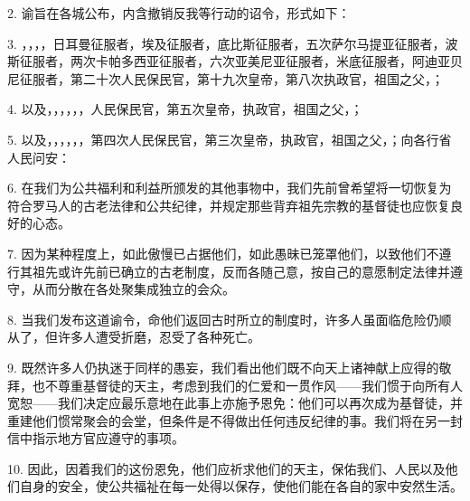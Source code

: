 2. 谕旨在各城公布，内含撤销反我等行动的诏令，形式如下：\par

3. ，，，，日耳曼征服者，埃及征服者，底比斯征服者，五次萨尔马提亚征服者，波斯征服者，两次卡帕多西亚征服者，六次亚美尼亚征服者，米底征服者，阿迪亚贝尼征服者，第二十次人民保民官，第十九次皇帝，第八次执政官，祖国之父，；\par

4. 以及，，，，，，人民保民官，第五次皇帝，执政官，祖国之父，；\par

5. 以及，，，，，，第四次人民保民官，第三次皇帝，执政官，祖国之父，；向各行省人民问安：\par

6. 在我们为公共福利和利益所颁发的其他事物中，我们先前曾希望将一切恢复为符合罗马人的古老法律和公共纪律，并规定那些背弃祖先宗教的基督徒也应恢复良好的心态。\par

7. 因为某种程度上，如此傲慢已占据他们，如此愚昧已笼罩他们，以致他们不遵行其祖先或许先前已确立的古老制度，反而各随己意，按自己的意愿制定法律并遵守，从而分散在各处聚集成独立的会众。\par

8. 当我们发布这道谕令，命他们返回古时所立的制度时，许多人虽面临危险仍顺从了，但许多人遭受折磨，忍受了各种死亡。\par

9. 既然许多人仍执迷于同样的愚妄，我们看出他们既不向天上诸神献上应得的敬拜，也不尊重基督徒的天主，考虑到我们的仁爱和一贯作风——我们惯于向所有人宽恕——我们决定应最乐意地在此事上亦施予恩免：他们可以再次成为基督徒，并重建他们惯常聚会的会堂，但条件是不得做出任何违反纪律的事。我们将在另一封信中指示地方官应遵守的事项。\par

10. 因此，因着我们的这份恩免，他们应祈求他们的天主，保佑我们、人民以及他们自身的安全，使公共福祉在每一处得以保存，使他们能在各自的家中安然生活。\par

